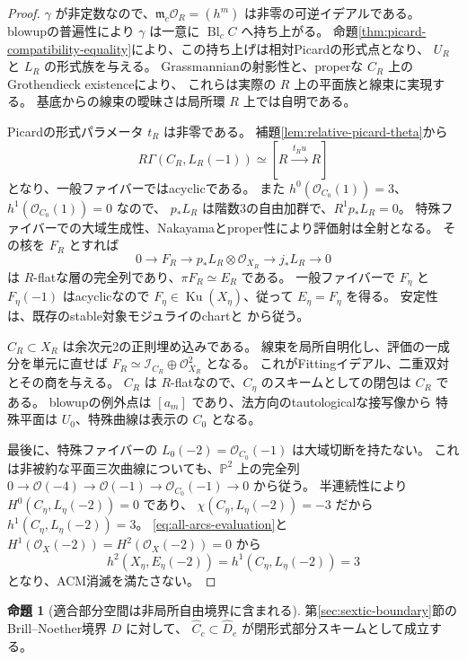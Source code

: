 \documentclass[a4paper,11pt]{ltjsarticle}
\theoremstyle{definition}
\newtheorem{theorem}{命題}[section]
\newcommand{\OO}{\mathcal O}
\newcommand{\PP}{\mathbb P}
\newcommand{\Ku}{\operatorname{Ku}}
\begin{document}
\begin{proof}
$\gamma$ が非定数なので、$\mathfrak m_c\OO_R=(h^m)$ は非零の可逆イデアルである。
blowupの普遍性により $\gamma$ は一意に $\operatorname{Bl}_cC$ へ持ち上がる。
命題\ref{thm:picard-compatibility-equality}により、この持ち上げは相対Picardの形式点となり、
$U_R$ と $L_R$ の形式族を与える。
Grassmannianの射影性と、properな $C_R$ 上のGrothendieck existenceにより、
これらは実際の $R$ 上の平面族と線束に実現する。
基底からの線束の曖昧さは局所環 $R$ 上では自明である。

Picardの形式パラメータ $t_R$ は非零である。
補題\ref{lem:relative-picard-theta}から
\[
 R\Gamma(C_R,L_R(-1))\simeq[R\xrightarrow{\,t_Ru\,}R]
\]
となり、一般ファイバーではacyclicである。
また $h^0(\OO_{C_0}(1))=3$、$h^1(\OO_{C_0}(1))=0$ なので、
$p_*L_R$ は階数3の自由加群で、$R^1p_*L_R=0$。
特殊ファイバーでの大域生成性、Nakayamaとproper性により評価射は全射となる。
その核を $F_R$ とすれば
\[
 0\longrightarrow F_R\longrightarrow p_*L_R\otimes\OO_{X_R}
 \longrightarrow j_*L_R\longrightarrow0
\]
は $R$-flatな層の完全列であり、$\pi F_R\simeq E_R$ である。
一般ファイバーで $F_\eta$ と $F_\eta(-1)$ はacyclicなので
$F_\eta\in\Ku(X_\eta)$、従って $E_\eta=F_\eta$ を得る。
安定性は、既存のstable対象モジュライのchartと
\cite[Proposition 5.5]{FLZ}から従う。

$C_R\subset X_R$ は余次元2の正則埋め込みである。
線束を局所自明化し、評価の一成分を単元に直せば
$F_R\simeq\mathcal I_{C_R}\oplus\OO_{X_R}^2$ となる。
これがFittingイデアル、二重双対とその商を与える。
$C_R$ は $R$-flatなので、$C_\eta$ のスキームとしての閉包は $C_R$ である。
blowupの例外点は $[a_m]$ であり、法方向のtautologicalな接写像から
特殊平面は $U_0$、特殊曲線は表示の $C_0$ となる。

最後に、特殊ファイバーの $L_0(-2)=\OO_{C_0}(-1)$ は大域切断を持たない。
これは非被約な平面三次曲線についても、$\PP^2$ 上の完全列
$0\to\OO(-4)\to\OO(-1)\to\OO_{C_0}(-1)\to0$ から従う。
半連続性により $H^0(C_\eta,L_\eta(-2))=0$ であり、
$\chi(C_\eta,L_\eta(-2))=-3$ だから $h^1(C_\eta,L_\eta(-2))=3$。
\eqref{eq:all-arcs-evaluation}と $H^1(\OO_X(-2))=H^2(\OO_X(-2))=0$ から
\[
 h^2(X_\eta,E_\eta(-2))=h^1(C_\eta,L_\eta(-2))=3
\]
となり、ACM消滅を満たさない。
\end{proof}

\begin{theorem}[適合部分空間は非局所自由境界に含まれる]
\label{thm:compatibility-in-bn-boundary}
第\ref{sec:sextic-boundary}節のBrill--Noether境界 $D$ に対して、
$\widehat C_c\subset\widehat D_e$ が閉形式部分スキームとして成立する。
\end{theorem}
\end{document}
